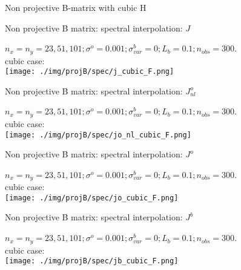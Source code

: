 \documentclass[francais]{beamer}
\begin{document}

\begin{frame}
\begin{center}
\huge{Non projective B-matrix with cubic H}
\end{center}
\end{frame}

\begin{frame}{Non projective B matrix: spectral interpolation: $J$}
\begin{center}
$n_x=n_y=23,51,101 ; \sigma^o = 0.001 ; \sigma^b_{var} = 0 ; L_b = 0.1 ; n_{obs}=300$.\\
cubic case:\\
\texttt{[image: ./img/projB/spec/j\_cubic\_F.png]}
\end{center}
\end{frame}

\begin{frame}{Non projective B matrix: spectral interpolation: $J^o_{nl}$}
\begin{center}
$n_x=n_y=23,51,101 ; \sigma^o = 0.001 ; \sigma^b_{var} = 0 ; L_b = 0.1 ; n_{obs}=300$.\\
cubic case:\\
\texttt{[image: ./img/projB/spec/jo\_nl\_cubic\_F.png]}
\end{center}
\end{frame}

\begin{frame}{Non projective B matrix: spectral interpolation: $J^o$}
\begin{center}
$n_x=n_y=23,51,101 ; \sigma^o = 0.001 ; \sigma^b_{var} = 0 ; L_b = 0.1 ; n_{obs}=300$.\\
cubic case:\\
\texttt{[image: ./img/projB/spec/jo\_cubic\_F.png]}
\end{center}
\end{frame}

\begin{frame}{Non projective B matrix: spectral interpolation: $J^b$}
\begin{center}
$n_x=n_y=23,51,101 ; \sigma^o = 0.001 ; \sigma^b_{var} = 0 ; L_b = 0.1 ; n_{obs}=300$.\\
cubic case:\\
\texttt{[image: ./img/projB/spec/jb\_cubic\_F.png]}
\end{center}
\end{frame}
\end{document}
